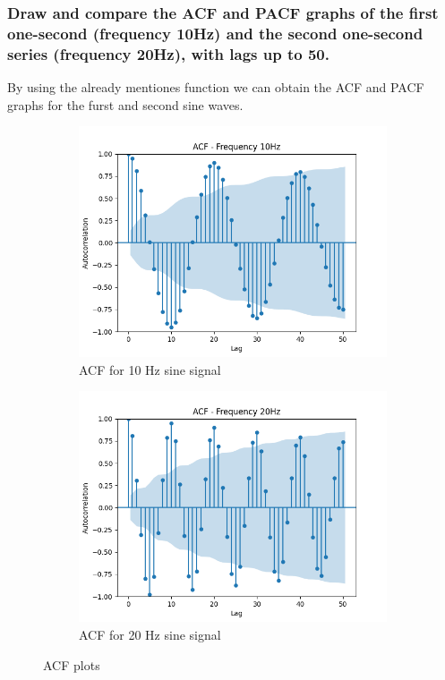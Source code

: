 \documentclass{article}
\begin{document}
\subsubsection{Draw and compare the ACF and PACF graphs of the first one-second (frequency
 10Hz) and the second one-second series (frequency 20Hz), with lags up to 50.}
By using the already mentiones function we can obtain the ACF and PACF graphs for the furst and second sine waves. 
\begin{figure}[htbp]
  \centering
  \begin{subfigure}[b]{0.45\textwidth}
    \includegraphics[width=\textwidth]{img/stacked_sin/ACF10HZ.png}
    \caption{ACF for 10 Hz sine signal}
    \label{fig:acf10}
  \end{subfigure}
  \hfill
  \begin{subfigure}[b]{0.45\textwidth}
    \includegraphics[width=\textwidth]{img/stacked_sin/ACF20HZ.png}
    \caption{ACF for 20 Hz sine signal}
    \label{fig:acf20}
  \end{subfigure}
  \caption{ACF plots}
  \label{fig:ACFsines}
\end{figure}
\end{document}
